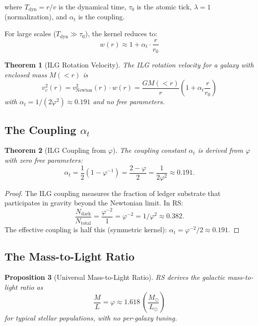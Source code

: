 \documentclass[12pt,a4paper]{article}
\newtheorem{theorem}{Theorem}[section]
\newtheorem{proposition}[theorem]{Proposition}
\theoremstyle{definition}
\theoremstyle{remark}
\begin{document}
where $T_\mathrm{dyn} = r/v$ is the dynamical time, $\tau_0$ is the atomic tick, 
$\lambda = 1$ (normalization), and $\alpha_t$ is the coupling.

For large scales ($T_\mathrm{dyn} \gg \tau_0$), the kernel reduces to:
\begin{equation}
w(r) \approx 1 + \alpha_t \cdot \frac{r}{r_0}
\end{equation}

\begin{theorem}[ILG Rotation Velocity]
The ILG rotation velocity for a galaxy with enclosed mass $M(<r)$ is
\begin{equation}
v_c^2(r) = v_\mathrm{Newton}^2(r) \cdot w(r) = \frac{GM(<r)}{r}\left(1 + \alpha_t \frac{r}{r_0}\right)
\end{equation}
with $\alpha_t = 1/(2\varphi^2) \approx 0.191$ and no free parameters.
\end{theorem}

\subsection{The Coupling $\alpha_t$}

\begin{theorem}[ILG Coupling from $\varphi$]
The coupling constant $\alpha_t$ is derived from $\varphi$ with zero free parameters:
\begin{equation}
\boxed{\alpha_t = \frac{1}{2}\left(1 - \varphi^{-1}\right) = \frac{2 - \varphi}{2} = \frac{1}{2\varphi^2} \approx 0.191.}
\end{equation}
\end{theorem}

\begin{proof}
The ILG coupling measures the fraction of ledger substrate that 
participates in gravity beyond the Newtonian limit. In RS:
\begin{equation}
\frac{N_\mathrm{dark}}{N_\mathrm{total}} = \frac{\varphi^{-2}}{1} = \varphi^{-2} = 1/\varphi^2 \approx 0.382.
\end{equation}
The effective coupling is half this (symmetric kernel): $\alpha_t = \varphi^{-2}/2 \approx 0.191$.
\end{proof}

\subsection{The Mass-to-Light Ratio}

\begin{proposition}[Universal Mass-to-Light Ratio]
RS derives the galactic mass-to-light ratio as
\begin{equation}
\frac{M}{L} = \varphi \approx 1.618~\left(\frac{M_\odot}{L_\odot}\right)
\end{equation}
for typical stellar populations, with no per-galaxy tuning.
\end{proposition}
\end{document}
